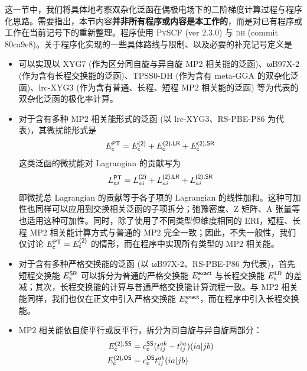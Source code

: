 这一节中，我们将具体地考察双杂化泛函在偶极电场下的二阶梯度计算过程与程序化思路。需要指出，本节内容\textbf{并非所有程序或内容是本工作的}，而是对已有程序或工作在当前记号下的重新整理。程序使用 \textsc{PySCF} (ver 2.3.0) 与 \textsc{dh} (commit 80ca9e8)。关于程序化实现的一些具体路线与限制、以及必要的补充记号定义是
\begin{itemize}[nosep]
    \item 可以实现以 XYG7 (作为区分同自旋与异自旋 MP2 相关能的泛函)、ωB97X-2 (作为含有长程交换能的泛函)、TPSS0-DH (作为含有 meta-GGA 的双杂化泛函)、lrc-XYG3 (作为含有普通、长程、短程 MP2 相关能的泛函) 等为代表的双杂化泛函的极化率计算。
    \item 对于含有多种 MP2 相关能形式的泛函 (以 lrc-XYG3、RS-PBE-P86 为代表)，其微扰能形式是
        \begin{equation*}
          E_{\textsf{c}}^{\textsf{PT}} = E_{\textsf{c}}^{\textsf{(2)}} + E_{\textsf{c}}^{\textsf{(2)}, \textsf{LR}} + E_{\textsf{c}}^{\textsf{(2)}, \textsf{SR}}
        \end{equation*}
        这类泛函的微扰能对 Lagrangian 的贡献写为
        \begin{equation*}
          L_{ai}^{\textsf{PT}} = L_{ai}^{\textsf{(2)}} + L_{ai}^{\textsf{(2)}, \textsf{LR}} + L_{ai}^{\textsf{(2)}, \textsf{SR}}
        \end{equation*}
        即微扰总 Lagrangian 的贡献等于各子项的 Lagrangian 的线性加和。这种可加性也同样可以应用到交换相关泛函的子项拆分；弛豫密度、Z 矩阵、A 张量等也适用这种可加性。同时，除了使用了不同类型但维度相同的 ERI，短程、长程 MP2 相关能计算方式与普通的 MP2 完全一致；因此，不失一般性，我们仅讨论 $E_{\textsf{c}}^{\textsf{PT}} = E_{\textsf{c}}^{\textsf{(2)}}$ 的情形，而在程序中实现所有类型的 MP2 相关能。
    \item 对于含有多种严格交换能的泛函 (以 ωB97X-2、RS-PBE-P86 为代表)，首先短程交换能 $E_{\textsf{x}}^{\textsf{SR}}$ 可以拆分为普通的严格交换能 $E_{\textsf{x}}^{\textsf{exact}}$ 与长程交换能 $E_{\textsf{x}}^{\textsf{LR}}$ 的差减；其次，长程交换能的计算与普通严格交换能计算流程一致。与 MP2 相关能同样，我们也仅在正文中引入严格交换能 $E_{\textsf{x}}^{\textsf{exact}}$，而在程序中引入长程交换能。
    \item MP2 相关能依自旋平行或反平行，拆分为同自旋与异自旋两部分：
        \begin{align}
          E_\textmt{c}^{\textmt{(2)}, \textmt{SS}} &= c_\textmt{c}^\textmt{SS} (t_{ij}^{ab} - t_{ij}^{ba}) (ia|jb) \\
          E_\textmt{c}^{\textmt{(2)}, \textmt{OS}} &= c_\textmt{c}^\textmt{OS} t_{ij}^{ab} (ia|jb) 

\end{align}
\end{itemize}
